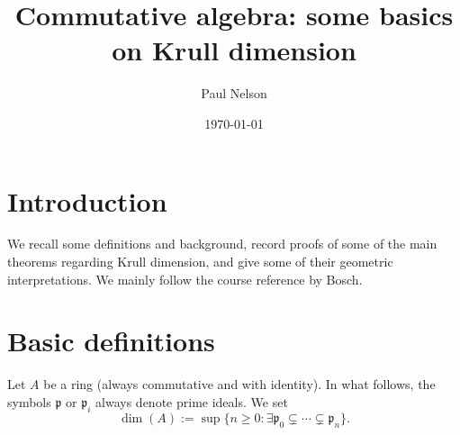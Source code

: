 \documentclass[10pt]{article}
\author{Paul Nelson}
\date{\today}
\title{Commutative algebra: some basics on Krull dimension}
\begin{document}
\maketitle
\tableofcontents


\section{Introduction}
\label{sec:org2573665}

We recall some definitions and background, record proofs of some
of the main theorems regarding Krull dimension, and give some of
their geometric interpretations.
We mainly follow the course reference by Bosch.

\section{Basic definitions}
\label{sec:orgdb2d3a0}

Let \(A\) be a ring (always commutative and with identity).
In what follows,
the symbols \(\mathfrak{p}\) or \(\mathfrak{p}_i\)
always denote prime ideals.
We set
\[
    \dim(A) :=
    \sup \{n \geq 0 : \exists \mathfrak{p}_0 \subsetneq \dotsb \subsetneq \mathfrak{p}_n \}.
  \]
\end{document}
